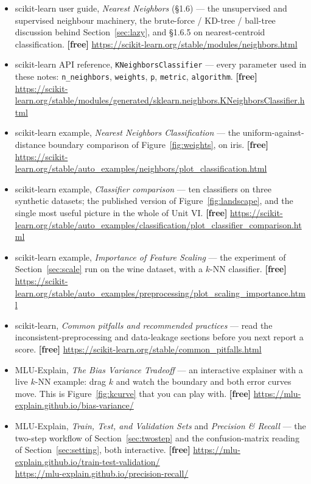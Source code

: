\documentclass[11pt]{article}
\begin{document}
\begin{itemize}[leftmargin=*]
  \item scikit-learn user guide, \emph{Nearest Neighbors} (\S1.6) --- the
    unsupervised and supervised neighbour machinery, the brute-force / KD-tree
    / ball-tree discussion behind Section~\ref{sec:lazy}, and
    \S1.6.5 on nearest-centroid classification. \textbf{[free]}
    \url{https://scikit-learn.org/stable/modules/neighbors.html}
  \item scikit-learn API reference, \texttt{KNeighborsClassifier} --- every
    parameter used in these notes: \texttt{n\_neighbors}, \texttt{weights},
    \texttt{p}, \texttt{metric}, \texttt{algorithm}. \textbf{[free]}
    \url{https://scikit-learn.org/stable/modules/generated/sklearn.neighbors.KNeighborsClassifier.html}
  \item scikit-learn example, \emph{Nearest Neighbors Classification} --- the
    uniform-against-distance boundary comparison of
    Figure~\ref{fig:weights}, on iris. \textbf{[free]}
    \url{https://scikit-learn.org/stable/auto_examples/neighbors/plot_classification.html}
  \item scikit-learn example, \emph{Classifier comparison} --- ten classifiers
    on three synthetic datasets; the published version of
    Figure~\ref{fig:landscape}, and the single most useful picture in the whole
    of Unit VI. \textbf{[free]}
    \url{https://scikit-learn.org/stable/auto_examples/classification/plot_classifier_comparison.html}
  \item scikit-learn example, \emph{Importance of Feature Scaling} --- the
    experiment of Section~\ref{sec:scale} run on the wine dataset, with a
    $k$-NN classifier. \textbf{[free]}
    \url{https://scikit-learn.org/stable/auto_examples/preprocessing/plot_scaling_importance.html}
  \item scikit-learn, \emph{Common pitfalls and recommended practices} --- read
    the inconsistent-preprocessing and data-leakage sections before you next
    report a score. \textbf{[free]}
    \url{https://scikit-learn.org/stable/common_pitfalls.html}
  \item MLU-Explain, \emph{The Bias Variance Tradeoff} --- an interactive
    explainer with a live $k$-NN example: drag $k$ and watch the boundary and
    both error curves move. This is Figure~\ref{fig:kcurve} that you can
    play with. \textbf{[free]}
    \url{https://mlu-explain.github.io/bias-variance/}
  \item MLU-Explain, \emph{Train, Test, and Validation Sets} and
    \emph{Precision \& Recall} --- the two-step workflow of
    Section~\ref{sec:twostep} and the confusion-matrix reading of
    Section~\ref{sec:setting}, both interactive. \textbf{[free]}
    \url{https://mlu-explain.github.io/train-test-validation/} \\
    \url{https://mlu-explain.github.io/precision-recall/}
\end{itemize}

\enlargethispage{4\baselineskip}
\notesources{\AMLUnitVISources}
\end{document}
